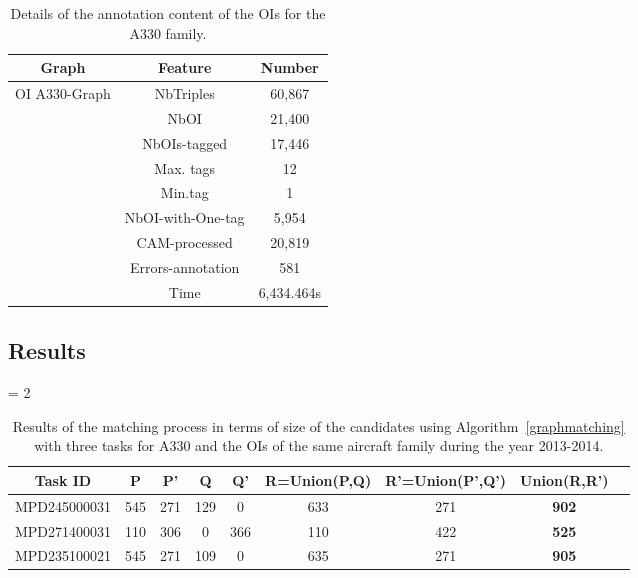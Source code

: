 \documentclass[a4paper,english,submission]{rnti}  %
\begin{document}
\begin{table}
\centering
\begin{tabular}{|c|c|c|}
\hline 
Graph & Feature & Number \\ 
\hline 
 \multirow{10}{*}{OI A330-Graph} & NbTriples & 60,867 \\ 
 
 & NbOI & 21,400 \\ 
 
 & NbOIs-tagged & 17,446\\ 
 
 & Max. tags & 12 \\ 
 
 & Min.tag & 1\\ 
 
 & NbOI-with-One-tag & 5,954 \\ 
 
 & CAM-processed & 20,819 \\ 
 
 & Errors-annotation & 581 \\ 
 
 & Time & 6,434.464s \\ 
\hline 
\end{tabular}
\caption{Details of the annotation content of the OIs for the A330 family.}
\label{tab:grapha330}
\end{table}
 
\subsection{Results}
\label{sec:results}


\begin{table}[!htp]
\scriptsize
\begin{center}
   \tabcolsep = 2\tabcolsep

\begin{tabular}{|c|c|c|c|c|c|c|c|c|} 
\hline 
Task ID & P & P' & Q & Q'  & R=Union(P,Q) & R'=Union(P',Q') & Union(R,R') \\ 
\hline 
MPD245000031 & 545 & 271 & 129 & 0 &  633 & 271 &  \textbf{902}\\ 
\hline 
MPD271400031 & 110 & 306 & 0 & 366  & 110 & 422 &  \textbf{525} \\ 
\hline 
MPD235100021 & 545 & 271 & 109 & 0 &  635 & 271 &  \textbf{905} \\  
\hline 
\end{tabular} 
\caption{Results of the matching process in terms of size of the candidates using Algorithm~\ref{graphmatching} with three tasks for A330 and the OIs of the same aircraft family during the year 2013-2014.}
\label{tab:algo1}
\end{center}
\end{table}
\end{document}
